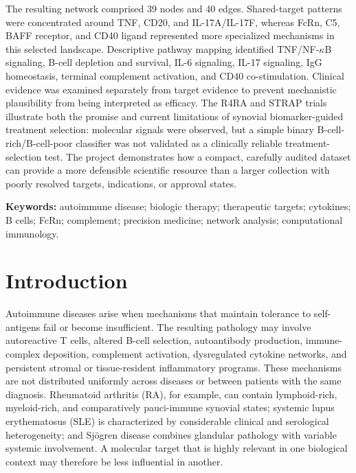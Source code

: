 \documentclass[12pt,a4paper]{article}
\begin{document}
The resulting network comprised 39 nodes and 40 edges. Shared-target patterns were concentrated around TNF, CD20, and IL-17A/IL-17F, whereas FcRn, C5, BAFF receptor, and CD40 ligand represented more specialized mechanisms in this selected landscape. Descriptive pathway mapping identified TNF/NF-\(\kappa\)B signaling, B-cell depletion and survival, IL-6 signaling, IL-17 signaling, IgG homeostasis, terminal complement activation, and CD40 co-stimulation. Clinical evidence was examined separately from target evidence to prevent mechanistic plausibility from being interpreted as efficacy. The R4RA and STRAP trials illustrate both the promise and current limitations of synovial biomarker-guided treatment selection: molecular signals were observed, but a simple binary B-cell-rich/B-cell-poor classifier was not validated as a clinically reliable treatment-selection test. The project demonstrates how a compact, carefully audited dataset can provide a more defensible scientific resource than a larger collection with poorly resolved targets, indications, or approval states.

\noindent\textbf{Keywords:} autoimmune disease; biologic therapy; therapeutic targets; cytokines; B cells; FcRn; complement; precision medicine; network analysis; computational immunology.
\clearpage\tableofcontents\clearpage\listoffigures\clearpage\listoftables\clearpage{}

\section{Introduction}
Autoimmune diseases arise when mechanisms that maintain tolerance to self-antigens fail or become insufficient. The resulting pathology may involve autoreactive T cells, altered B-cell selection, autoantibody production, immune-complex deposition, complement activation, dysregulated cytokine networks, and persistent stromal or tissue-resident inflammatory programs. These mechanisms are not distributed uniformly across diseases or between patients with the same diagnosis. Rheumatoid arthritis (RA), for example, can contain lymphoid-rich, myeloid-rich, and comparatively pauci-immune synovial states; systemic lupus erythematosus (SLE) is characterized by considerable clinical and serological heterogeneity; and Sjögren disease combines glandular pathology with variable systemic involvement. A molecular target that is highly relevant in one biological context may therefore be less influential in another.
\end{document}
